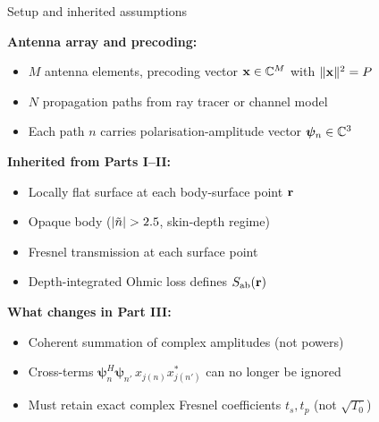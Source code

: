 
\begin{frame}[label=app-p3-setup]{Setup and inherited assumptions}

  \textbf{Antenna array and precoding:}
  \begin{itemize}
    \item $M$ antenna elements, precoding vector $\mathbf{x} \in \mathbb{C}^M$ with $\|\mathbf{x}\|^2 = P$
    \item $N$ propagation paths from ray tracer or channel model
    \item Each path $n$ carries polarisation-amplitude vector $\bm{\psi}_n \in \mathbb{C}^3$
  \end{itemize}

  \vspace{6pt}
  \textbf{Inherited from Parts I--II:}
  \begin{itemize}
    \item Locally flat surface at each body-surface point $\mathbf{r}$
    \item Opaque body ($|\tilde{n}| > 2.5$, skin-depth regime)
    \item Fresnel transmission at each surface point
    \item Depth-integrated Ohmic loss defines $S_{\mathrm{ab}}(\mathbf{r})$
  \end{itemize}

  \vspace{6pt}
  \textbf{What changes in Part III:}
  \begin{itemize}
    \item \textcolor{alertred}{Coherent summation of complex amplitudes} (not powers)
    \item Cross-terms $\bm{\psi}_n^H \bm{\psi}_{n'} \, x_{j(n)} x_{j(n')}^*$ can no longer be ignored
    \item Must retain exact complex Fresnel coefficients $t_s, t_p$ (not $\sqrt{T_0}$)
  \end{itemize}

  \vspace{4pt}
\end{frame}

